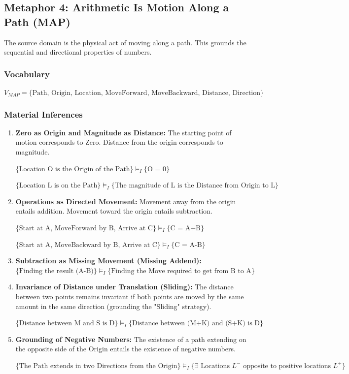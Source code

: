 \documentclass[12pt]{book}
\begin{document}
\subsection{Metaphor 4: Arithmetic Is Motion Along a Path (MAP)}

The source domain is the physical act of moving along a path. This grounds the sequential and directional properties of numbers.

\subsubsection{Vocabulary}
$V_{MAP} = \{\text{Path, Origin, Location, MoveForward, MoveBackward, Distance, Direction}\}$

\subsubsection{Material Inferences}

\begin{enumerate}
    \item \textbf{Zero as Origin and Magnitude as Distance:}
    The starting point of motion corresponds to Zero. Distance from the origin corresponds to magnitude.
    
    $\{\text{Location O is the Origin of the Path}\} \models_{I} \{\text{O = 0}\}$
    
    $\{\text{Location L is on the Path}\} \models_{I} \{\text{The magnitude of L is the Distance from Origin to L}\}$

    \item \textbf{Operations as Directed Movement:}
    Movement away from the origin entails addition. Movement toward the origin entails subtraction.
    
    $\{\text{Start at A, MoveForward by B, Arrive at C}\} \models_{I} \{\text{C = A+B}\}$
    
    $\{\text{Start at A, MoveBackward by B, Arrive at C}\} \models_{I} \{\text{C = A-B}\}$

    \item \textbf{Subtraction as Missing Movement (Missing Addend):}
    $\{\text{Finding the result (A-B)}\} \models_{I} \{\text{Finding the Move required to get from B to A}\}$

    \item \textbf{Invariance of Distance under Translation (Sliding):}
    The distance between two points remains invariant if both points are moved by the same amount in the same direction (grounding the "Sliding" strategy).
    
    $\{\text{Distance between M and S is D}\} \models_{I} \{\text{Distance between (M+K) and (S+K) is D}\}$

    \item \textbf{Grounding of Negative Numbers:}
    The existence of a path extending on the opposite side of the Origin entails the existence of negative numbers.
    
    $\{\text{The Path extends in two Directions from the Origin}\} \models_{I} \{\exists \text{ Locations } L^{-} \text{ opposite to positive locations } L^{+}\}$

\end{enumerate}
\end{document}
